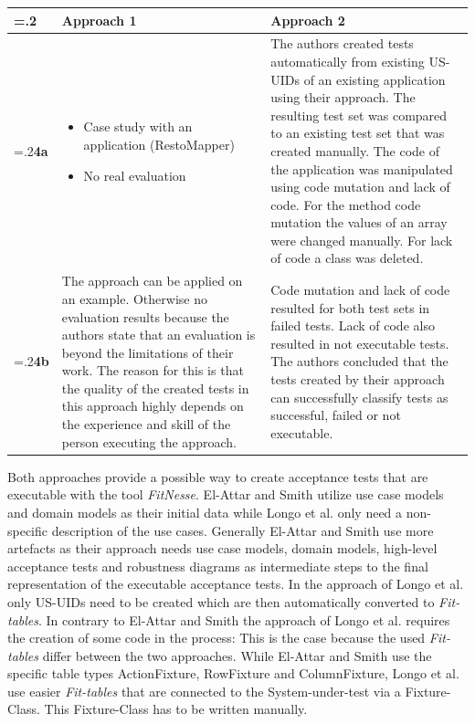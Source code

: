  \newpage
 \begin{tabularx}{\textwidth}{>{\hsize=.2\hsize}X|X|X}
  		 & \textbf{Approach 1} & \textbf{Approach 2} \\
  		\hline
  		 \textbf{4a} & \begin{itemize} \item Case study with an application (RestoMapper)
\item	No real evaluation \end{itemize}
 & The authors created tests automatically from existing US-UIDs of an existing application using their approach.
The resulting test set was compared to an existing test set that was created manually.
The code of the application was manipulated using code mutation and lack of code.
For the method code mutation the values of an array were changed manually. For lack of code a class was deleted.
 \\
  		 \textbf{4b} & The approach can be applied on an example.
Otherwise no evaluation results because the authors state that an evaluation is beyond the limitations of their work.
The reason for this is that the quality of the created tests in this approach highly depends on the experience and skill of the person executing the approach.

 & Code mutation and lack of code resulted for both test sets in failed tests.
Lack of code also resulted in not executable tests.
The authors concluded that the tests created by their approach can successfully classify tests as successful, failed or not executable.
 \\

 	\end{tabularx}
 	\renewcommand{\arraystretch}{1}

Both approaches provide a possible way to create acceptance tests that are executable with the tool \textit{FitNesse}.
El-Attar and Smith utilize use case models and domain models as their initial data while Longo et al. only need a non-specific description of the use cases.
Generally El-Attar and Smith use more artefacts as their approach needs use case models, domain models, high-level acceptance tests and robustness diagrams as intermediate steps to the final representation of the executable acceptance tests.
In the approach of Longo et al. only US-UIDs need to be created which are then automatically converted to \textit{Fit-tables}.
In contrary to El-Attar and Smith the approach of Longo et al. requires the creation of some code in the process:
This is the case because the used \textit{Fit-tables} differ between the two approaches.
While El-Attar and Smith use the specific table types ActionFixture, RowFixture and ColumnFixture, Longo et al. use easier \textit{Fit-tables} that are connected to the System-under-test via a Fixture-Class.
This Fixture-Class has to be written manually.

